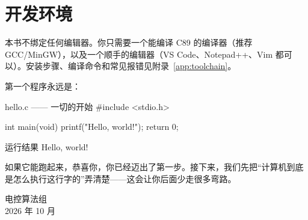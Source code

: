 \section*{开发环境}

本书不绑定任何编辑器。你只需要一个能编译 C89 的编译器（推荐 GCC/MinGW），以及一个顺手的编辑器（VS Code、Notepad++、Vim 都可以）。安装步骤、编译命令和常见报错见附录~\ref{app:toolchain}。

第一个程序永远是：

\begin{codebox}{hello.c —— 一切的开始}
#include <stdio.h>

int main(void)
{
    printf("Hello, world!\n");
    return 0;
}
\end{codebox}

\begin{outbox}{运行结果}
Hello, world!
\end{outbox}

如果它能跑起来，恭喜你，你已经迈出了第一步。接下来，我们先把“计算机到底是怎么执行这行字的”弄清楚——这会让你后面少走很多弯路。

\vspace{1em}
\begin{flushright}
\kaishu 电控算法组\\
2026 年 10 月
\end{flushright}
